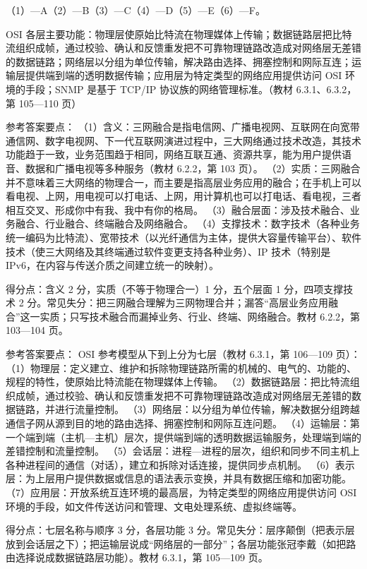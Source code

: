 \documentclass[a4paper,11pt]{article}
\begin{document}

\q （1）—A\quad （2）—B\quad （3）—C\quad （4）—D\quad （5）—E\quad （6）—F。
\begin{analysis}OSI 各层主要功能：物理层使原始比特流在物理媒体上传输；数据链路层把比特流组织成帧，通过校验、确认和反馈重发把不可靠物理链路改造成对网络层无差错的数据链路；网络层以分组为单位传输，解决路由选择、拥塞控制和网际互连；运输层提供端到端的透明数据传输；应用层为特定类型的网络应用提供访问 OSI 环境的手段；SNMP 是基于 TCP/IP 协议族的网络管理标准。（教材 6.3.1、6.3.2，第 105—110 页）\end{analysis}


\q 参考答案要点：
（1）含义：三网融合是指电信网、广播电视网、互联网在向宽带通信网、数字电视网、下一代互联网演进过程中，三大网络通过技术改造，其技术功能趋于一致，业务范围趋于相同，网络互联互通、资源共享，能为用户提供语音、数据和广播电视等多种服务（教材 6.2.2，第 103 页）。
（2）实质：三网融合并不意味着三大网络的物理合一，而主要是指高层业务应用的融合；在手机上可以看电视、上网，用电视可以打电话、上网，用计算机也可以打电话、看电视，三者相互交叉、形成你中有我、我中有你的格局。
（3）融合层面：涉及技术融合、业务融合、行业融合、终端融合及网络融合。
（4）支撑技术：数字技术（各种业务统一编码为比特流）、宽带技术（以光纤通信为主体，提供大容量传输平台）、软件技术（使三大网络及其终端通过软件变更支持各种业务）、IP 技术（特别是 IPv6，在内容与传送介质之间建立统一的映射）。
\begin{analysis}得分点：含义 2 分，实质（不等于物理合一）1 分，五个层面 1 分，四项支撑技术 2 分。常见失分：把三网融合理解为三网物理合并；漏答“高层业务应用融合”这一实质；只写技术融合而漏掉业务、行业、终端、网络融合。教材 6.2.2，第 103—104 页。\end{analysis}

\q 参考答案要点：
OSI 参考模型从下到上分为七层（教材 6.3.1，第 106—109 页）：
（1）物理层：定义建立、维护和拆除物理链路所需的机械的、电气的、功能的、规程的特性，使原始比特流能在物理媒体上传输。
（2）数据链路层：把比特流组织成帧，通过校验、确认和反馈重发把不可靠物理链路改造成对网络层无差错的数据链路，并进行流量控制。
（3）网络层：以分组为单位传输，解决数据分组跨越通信子网从源到目的地的路由选择、拥塞控制和网际互连问题。
（4）运输层：第一个端到端（主机—主机）层次，提供端到端的透明数据运输服务，处理端到端的差错控制和流量控制。
（5）会话层：进程—进程的层次，组织和同步不同主机上各种进程间的通信（对话），建立和拆除对话连接，提供同步点机制。
（6）表示层：为上层用户提供数据或信息的语法表示变换，并具有数据压缩和加密功能。
（7）应用层：开放系统互连环境的最高层，为特定类型的网络应用提供访问 OSI 环境的手段，如文件传送访问和管理、文电处理系统、虚拟终端等。
\begin{analysis}得分点：七层名称与顺序 3 分，各层功能 3 分。常见失分：层序颠倒（把表示层放到会话层之下）；把运输层说成“网络层的一部分”；各层功能张冠李戴（如把路由选择说成数据链路层功能）。教材 6.3.1，第 105—109 页。\end{analysis}
\end{document}
